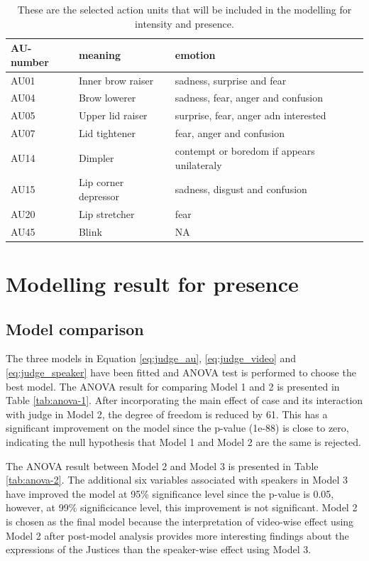 \documentclass{monashthesis}
\begin{document}
\begin{table}[ht]
\begin{center}
\caption{\label{tab:au-included} These are the selected action units that will be included in the modelling for intensity and presence.}
\begin{tabular}{lll}
\toprule
AU-number & meaning & emotion \\
\midrule
AU01 & Inner brow raiser & sadness, surprise and fear \\
AU04 & Brow lowerer & sadness, fear, anger and confusion \\
AU05 & Upper lid raiser & surprise, fear, anger adn interested \\
AU07 & Lid tightener & fear, anger and confusion \\
AU14 & Dimpler & contempt or boredom if appears unilateraly \\
AU15 & Lip corner depressor & sadness, disgust and confusion \\
AU20 & Lip stretcher & fear \\
AU45 & Blink & NA \\
\bottomrule
\end{tabular}
\end{center}
\end{table}

\hypertarget{modelling-result-for-presence}{%
\section{Modelling result for presence}\label{modelling-result-for-presence}}

\hypertarget{model-comparison-1}{%
\subsection{Model comparison}\label{model-comparison-1}}

The three models in Equation \ref{eq:judge_au}, \ref{eq:judge_video} and \ref{eq:judge_speaker} have been fitted and ANOVA test is performed to choose the best model. The ANOVA result for comparing Model 1 and 2 is presented in Table \ref{tab:anova-1}. After incorporating the main effect of case and its interaction with judge in Model 2, the degree of freedom is reduced by 61. This has a significant improvement on the model since the p-value (1e-88) is close to zero, indicating the null hypothesis that Model 1 and Model 2 are the same is rejected.

The ANOVA result between Model 2 and Model 3 is presented in Table \ref{tab:anova-2}. The additional six variables associated with speakers in Model 3 have improved the model at 95\% significance level since the p-value is 0.05, however, at 99\% significicance level, this improvement is not significant. Model 2 is chosen as the final model because the interpretation of video-wise effect using Model 2 after post-model analysis provides more interesting findings about the expressions of the Justices than the speaker-wise effect using Model 3.
\end{document}
